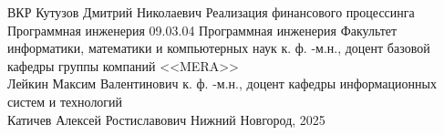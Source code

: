 \begin{titlepage}
\newpage

\maketitlekrvkr
{ВКР} %
{Кутузов Дмитрий Николаевич} %
{Реализация финансового процессинга} %
{Программная инженерия} %
{09.03.04 Программная инженерия} %
{Факультет информатики, математики и компьютерных наук} %
{к. ф. -м.н., доцент базовой кафедры группы компаний <<MERA>>\\Лейкин Максим Валентинович} %
{к. ф. -м.н., доцент кафедры информационных систем и технологий\\Катичев Алексей Ростиславович} %
{Нижний Новгород, 2025} %


\end{titlepage}
